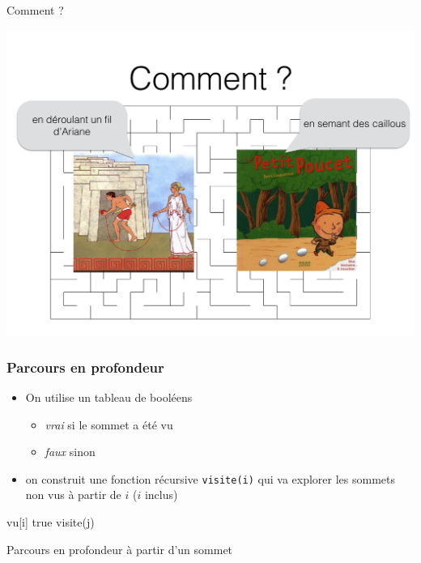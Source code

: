 \begin{frame}{Comment ?}
    \begin{center}
        \includegraphics[width=.75\textwidth]{fig/labyrinthe-3.pdf}
    \end{center}
\end{frame}

\begin{frame}[fragile]
\frametitle{Parcours en profondeur}
    \begin{itemize}
        \item On utilise un tableau de booléens 
        \begin{itemize}
            \item \emph{vrai} si le sommet a été vu 
            \item \emph{faux} sinon 
        \end{itemize}
        \item on construit une fonction récursive \texttt{visite(i)} qui va explorer les sommets non vus à partir de $i$ ($i$ inclus)
    \end{itemize}
    
    \begin{algorithm}[H]
        \begin{algorithmic}[1]
            \State vu[i] \gets true
                    \State visite(j)
                \EndIf
            \EndFor
            \EndFunction
         \end{algorithmic}
        \caption{Parcours en profondeur à partir d'un sommet}
        \label{alg:prof:visite}
        \end{algorithm}
\end{frame}



